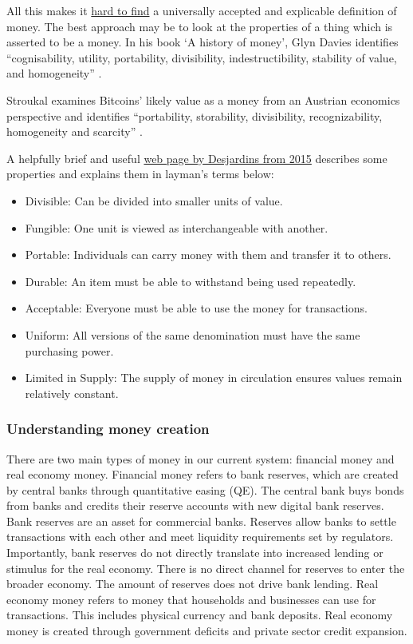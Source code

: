 All this makes it \href{https://www.lynalden.com/what-is-money/}{hard to find} a universally accepted and explicable definition of money. The best approach may be to look at the properties of a thing which is asserted to be a money. In his book `A history of money', Glyn Davies identifies ``cognisability, utility,  portability, divisibility, indestructibility, stability of value, and homogeneity'' \cite{davies2010history}.\par
Stroukal examines Bitcoins' likely value as a money from an Austrian economics perspective and identifies ``portability, storability, divisibility, recognizability, homogeneity and scarcity'' \cite{stroukal2018can}.\par
A helpfully brief and useful \href{http://money.visualcapitalist.com/infographic-the-properties-of-money/}{web page by Desjardins from 2015} describes some properties and explains them in layman's terms below:
\begin{itemize}
\item Divisible: Can be divided into smaller units of value.
\item Fungible: One unit is viewed as interchangeable with another.
\item Portable: Individuals can carry money with them and transfer it to others.
\item Durable: An item must be able to withstand being used repeatedly.
\item Acceptable: Everyone must be able to use the money for transactions.
\item Uniform: All versions of the same denomination must have the same purchasing power.
\item Limited in Supply: The supply of money in circulation ensures values remain relatively constant.
\end{itemize}
\subsubsection{Understanding money creation}

There are two main types of money in our current system: financial money and real economy money.
Financial money refers to bank reserves, which are created by central banks through quantitative easing (QE). The central bank buys bonds from banks and credits their reserve accounts with new digital bank reserves.
Bank reserves are an asset for commercial banks. Reserves allow banks to settle transactions with each other and meet liquidity requirements set by regulators.
Importantly, bank reserves do not directly translate into increased lending or stimulus for the real economy. There is no direct channel for reserves to enter the broader economy. The amount of reserves does not drive bank lending.
Real economy money refers to money that households and businesses can use for transactions. This includes physical currency and bank deposits.
Real economy money is created through government deficits and private sector credit expansion.
